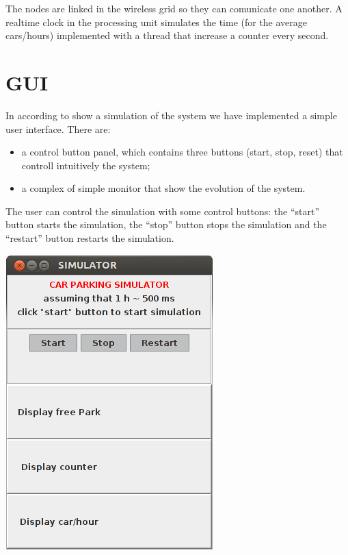 \documentclass[a4paper,titlepage]{article}
\begin{document}
The nodes are linked in the wireless grid so they can comunicate one another. A realtime clock in the processing unit simulates the time (for the average cars/hours) implemented with a thread that increase a counter every second.

\section*{GUI}

In according to show a simulation of the system we have implemented a simple user interface. There are:

\begin{itemize}

\item a control button panel, which contains three buttons (start, stop, reset) that controll intuitively the system;
\item a complex of simple monitor that show the evolution of the system.

\end{itemize}

The user can control the simulation with some control buttons: the ``start'' button starts the simulation, the ``stop'' button stops the simulation and the ``restart'' button restarts the simulation.

    \begin{center}

    \centering
    \includegraphics[scale=0.50]{interface.png}

    \end{center}
\end{document}
